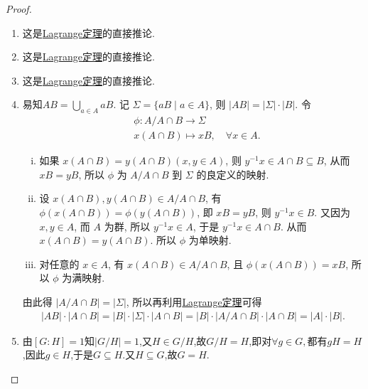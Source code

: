 \documentclass[../../main.tex]{subfiles}%
\begin{document}
\begin{proof}
\begin{enumerate}[(1)]
\item 这是\hyperref[theorem:抽象代数--Lagrange定理]{Lagrange定理}的直接推论. 

\item 这是\hyperref[theorem:抽象代数--Lagrange定理]{Lagrange定理}的直接推论. 

\item 这是\hyperref[theorem:抽象代数--Lagrange定理]{Lagrange定理}的直接推论. 

\item 易知$AB = \bigcup\limits_{a \in A} aB$. 记 $\Sigma = \{aB \mid a \in A\}$, 则 $|AB| = |\Sigma| \cdot |B|$. 令
\begin{align*}
&\phi : A/A\cap B\longrightarrow \Sigma 
\\
&x(A\cap B)\longmapsto xB,\quad \forall x\in A.
\end{align*}
\begin{enumerate}[(i)]
\item 如果 $x(A\cap B) = y(A\cap B)(x,y \in A)$, 则 $y^{-1}x \in A\cap B \subseteq B$, 从而 $xB = yB$, 所以 $\phi$ 为 $A/A\cap B$ 到 $\Sigma$ 的良定义的映射.

\item 设 $x(A\cap B),y(A\cap B) \in A/A\cap B$, 有 $\phi(x(A\cap B)) = \phi(y(A\cap B))$, 即 $xB = yB$, 则 $y^{-1}x \in B$. 又因为 $x,y \in A$, 而 $A$ 为群, 所以 $y^{-1}x \in A$, 于是 $y^{-1}x \in A\cap B$. 从而 $x(A\cap B) = y(A\cap B)$. 所以 $\phi$ 为单映射.

\item 对任意的 $x \in A$, 有 $x(A\cap B) \in A/A\cap B$, 且 $\phi(x(A\cap B)) = xB$, 所以 $\phi$ 为满映射.
\end{enumerate}
由此得 $|A/A\cap B| = |\Sigma|$, 所以再利用\hyperref[theorem:抽象代数--Lagrange定理]{Lagrange定理}可得
\begin{align*}
|AB| \cdot |A\cap B| = |B| \cdot |\Sigma| \cdot |A\cap B| = |B| \cdot |A/A\cap B| \cdot |A\cap B| = |A| \cdot |B|.
\end{align*}

\item 由$[G:H]=1$知$|G/H|=1$,又$H\in G/H$,故$G/H=H$,即对$\forall g\in G,$都有$gH = H$,因此$g\in H$,于是$G\subseteq H$.又$H\subseteq G$,故$G=H$.
\end{enumerate}

\end{proof}
\end{document}

